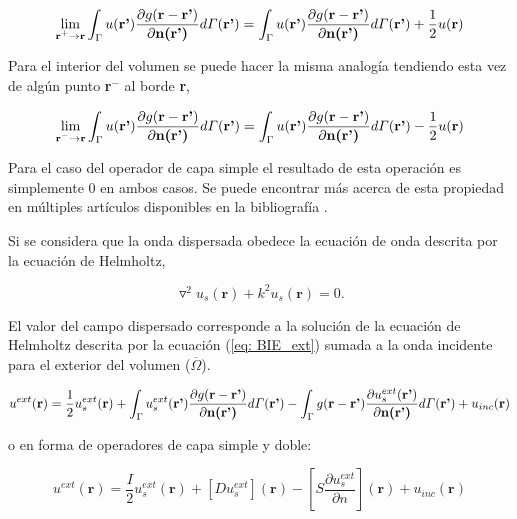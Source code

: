 \documentclass[12pt,letterpaper]{article}
\numberwithin{equation}{section}
\begin{document}
$$\lim\limits_{\textbf{r$^+$}\rightarrow \textbf{r}}\int_{\Gamma}u(\textbf{r'})\frac{\partial g(\textbf{r}-\textbf{r'})}{\partial\textbf{n(\textbf{r'})}}d\varGamma(\textbf{r'})=\int_{\Gamma}u(\textbf{r'})\frac{\partial g(\textbf{r}-\textbf{r'})}{\partial\textbf{n(\textbf{r'})}}d\varGamma(\textbf{r'}) + \frac{1}{2}u(\textbf{r})$$

Para el interior del volumen se puede hacer la misma analogía tendiendo esta vez de algún punto \textbf{r$^-$} al borde \textbf{r},

$$\lim\limits_{\textbf{r$^-$}\rightarrow \textbf{r}}\int_{\Gamma}u(\textbf{r'})\frac{\partial g(\textbf{r}-\textbf{r'})}{\partial\textbf{n(\textbf{r'})}}d\varGamma(\textbf{r'})=\int_{\Gamma}u(\textbf{r'})\frac{\partial g(\textbf{r}-\textbf{r'})}{\partial\textbf{n(\textbf{r'})}}d\varGamma(\textbf{r'}) - \frac{1}{2}u(\textbf{r})$$

Para el caso del operador de capa simple el resultado de esta operación es simplemente $0$ en ambos casos. Se puede encontrar más acerca de esta propiedad en múltiples artículos disponibles en la bibliografía \cite{BIE_Helmholtz_1,BIE_Helmholtz_2,Multiple scattering,Multitrace_acoustic}.

Si se considera que la onda dispersada obedece la ecuación de onda descrita por la ecuación de Helmholtz,

$$\triangledown^2u_s(\textbf{r})+k^2u_s(\textbf{r})=0.$$

El valor del campo dispersado corresponde a la solución de la ecuación de Helmholtz descrita por la ecuación (\ref{eq: BIE_ext}) sumada a la onda incidente para el exterior del volumen ($\overline{\Omega}$). 

\begin{equation}
u^{ext}(\textbf{r}) = \frac{1}{2}u_s^{ext}(\textbf{r}) + \int_{\Gamma}u_s^{ext}(\textbf{r'})\frac{\partial g(\textbf{r}-\textbf{r'})}{\partial\textbf{n(\textbf{r'})}}d\varGamma(\textbf{r'}) - \int_{\Gamma}g(\textbf{r}-\textbf{r'})\frac{\partial u_s^{ext}(\textbf{r'})}{\partial\textbf{n(\textbf{r'})}}d\varGamma(\textbf{r'}) +  u_{inc}(\textbf{r})
\label{eq: BIE_borde}	
\end{equation}


o en forma de operadores de capa simple y doble:

\begin{equation}
\boxed{
u^{ext}(\textbf{r})=\frac{I}{2}u_s^{ext}(\textbf{r}) + \left[D u_s^{ext}\right](\textbf{r}) - \left[S \frac{\partial u_s^{ext}}{\partial n}\right](\textbf{r}) + u_{inc}(\textbf{r})
}
\label{eq: sol us + uinc (ext)}
\end{equation}
\end{document}
